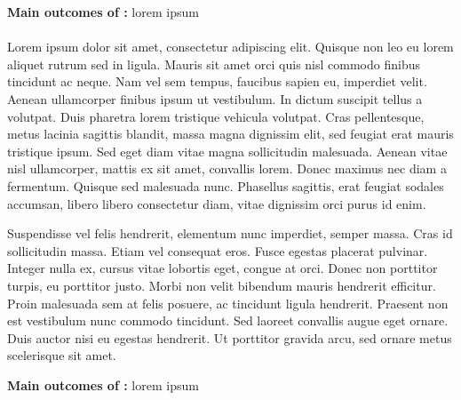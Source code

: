 \begin{framed}
    {\noindent\bf Main outcomes of \tDB:} lorem ipsum 
\end{framed}

\paragraph{\TDC}

\begin{rewrite}
Lorem ipsum dolor sit amet, consectetur adipiscing elit. Quisque non leo eu
lorem aliquet rutrum sed in ligula. Mauris sit amet orci quis nisl commodo
finibus tincidunt ac neque. Nam vel sem tempus, faucibus sapien eu,
imperdiet velit. Aenean ullamcorper finibus ipsum ut vestibulum. In dictum
suscipit tellus a volutpat. Duis pharetra lorem tristique vehicula volutpat.
Cras pellentesque, metus lacinia sagittis blandit, massa magna dignissim
elit, sed feugiat erat mauris tristique ipsum. Sed eget diam vitae magna
sollicitudin malesuada. Aenean vitae nisl ullamcorper, mattis ex sit amet,
convallis lorem. Donec maximus nec diam a fermentum. Quisque sed malesuada
nunc. Phasellus sagittis, erat feugiat sodales accumsan, libero libero
consectetur diam, vitae dignissim orci purus id enim.

Suspendisse vel felis hendrerit, elementum nunc imperdiet, semper massa. Cras id
sollicitudin massa. Etiam vel consequat eros. Fusce egestas placerat
pulvinar. Integer nulla ex, cursus vitae lobortis eget, congue at orci.
Donec non porttitor turpis, eu porttitor justo. Morbi non velit bibendum
mauris hendrerit efficitur. Proin malesuada sem at felis posuere, ac
tincidunt ligula hendrerit. Praesent non est vestibulum nunc commodo
tincidunt. Sed laoreet convallis augue eget ornare. Duis auctor nisi eu
egestas hendrerit. Ut porttitor gravida arcu, sed ornare metus scelerisque
sit amet. 
\end{rewrite}


\begin{framed}
    {\noindent\bf Main outcomes of \tDC:} lorem ipsum 
\end{framed}


\paragraph{\TDD}

